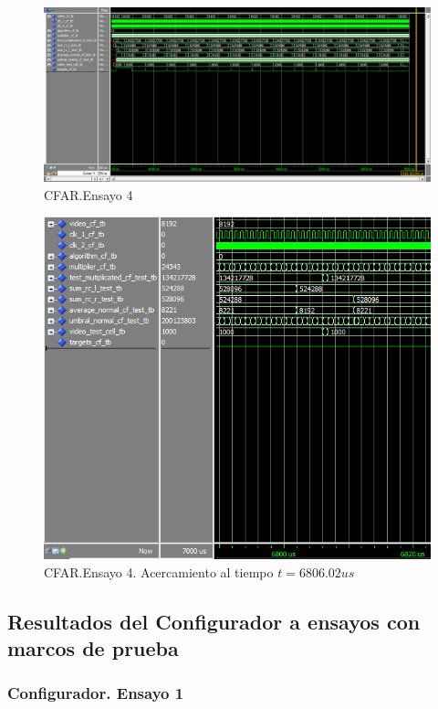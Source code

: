 \begin{figure}
\centering
\includegraphics[scale=0.52, angle=270]{./Figures/cfar_ensayo_4.png}
\caption{CFAR.Ensayo 4}
\label{fig:cfar_ensayo_4}
\end{figure}
	
\begin{figure}
\centering
\includegraphics[scale=0.7, angle=0]{./Figures/cfar_ensayo_4_zoom_multiplicador.png}
\caption{CFAR.Ensayo 4. Acercamiento al tiempo $t=6806.02 us$}
\label{fig:cfar_ensayo_4_zoom}
\end{figure}

\subsection{Resultados del Configurador a ensayos con marcos de prueba}


\subsubsection{Configurador. Ensayo 1}
\label{Subsec:Configurador. Ensayo 1}

